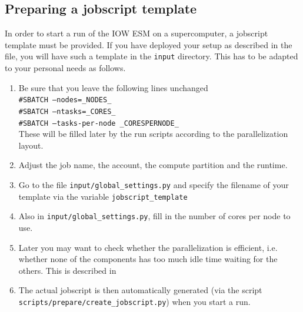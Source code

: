 \documentclass[a4paper,titlepage]{scrartcl}
\begin{document}
\subsection{Preparing a jobscript template}

In order to start a run of the IOW ESM on a supercomputer, a jobscript template must be provided.
If you have deployed your setup as described in the \Readme file, you will have such a template in the \texttt{input} directory.
This has to be adapted to your personal needs as follows.

\begin{sloppypar}
\begin{enumerate}
\item Be sure that you leave the following lines unchanged \\
\texttt{\#SBATCH --nodes=\_NODES\_}\\
\texttt{\#SBATCH --ntasks=\_CORES\_}\\
\texttt{\#SBATCH --tasks-per-node \_CORESPERNODE\_}\\
These will be filled later by the run scripts according to the parallelization layout.
\item Adjust the job name, the account, the compute partition and the runtime.
\item Go to the file \texttt{input/global\_settings.py} and specify the filename of your template via the variable \texttt{jobscript\_template}
\item Also in \texttt{input/global\_settings.py}, fill in the number of cores per node to use.
\item Later you may want to check whether the parallelization is efficient, i.e. whether none of the components has too much idle time waiting for the others. 
This is described in 
\item The actual jobscript is then automatically generated (via the script \texttt{scripts/prepare/create\_jobscript.py}) when you start a run.
\end{enumerate}
\end{sloppypar}
\end{document}
